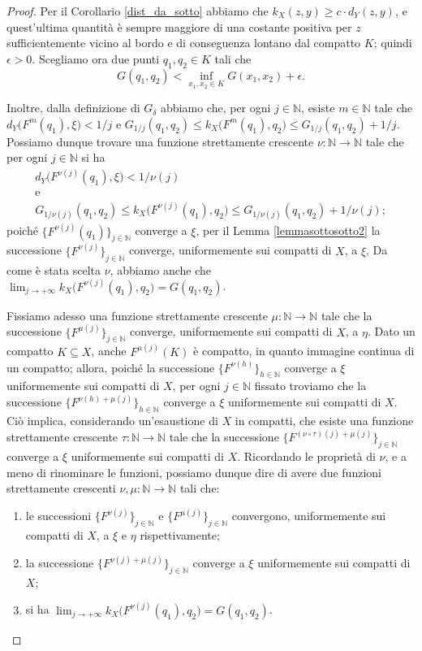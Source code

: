 \begin{proof}
    Per il Corollario \ref{dist_da_sotto} abbiamo che $k_X(z,y) \ge c\cdot d_Y(z,y)$, e quest'ultima quantità è sempre maggiore di una costante positiva per $z$ sufficientemente vicino al bordo e di conseguenza lontano dal compatto $K$; quindi $\epsilon>0$. Scegliamo ora due punti $q_1,q_2 \in K$ tali che
    $$G(q_1,q_2)<\inf_{x_1,x_2\in K}G(x_1,x_2)+\epsilon.$$
    
    Inoltre, dalla definizione di $G_{\delta}$ abbiamo che, per ogni $j\in\mathbb{N}$, esiste $m\in\mathbb{N}$ tale che $d_Y\big(F^m(q_1),\xi\big)<1/j$ e $G_{1/j}(q_1,q_2) \le k_X\big(F^m(q_1),q_2\big) \le G_{1/j}(q_1,q_2)+1/j$. Possiamo dunque trovare una funzione strettamente crescente $\nu:\mathbb{N}\longrightarrow\mathbb{N}$ tale che per ogni $j\in\mathbb{N}$ si ha
    \begin{gather*}
        d_Y\big(F^{\nu(j)}(q_1),\xi\big)<1/\nu(j)\\
        \text{e}\\
        G_{1/\nu(j)}(q_1,q_2) \le k_X\big(F^{\nu(j)}(q_1),q_2\big) \le G_{1/\nu(j)}(q_1,q_2)+1/\nu(j);
    \end{gather*}
    poiché $\{F^{\nu(j)}(q_1)\}_{j\in\mathbb{N}}$ converge a $\xi$, per il Lemma \ref{lemmasottosotto2} la successione $\{F^{\nu(j)}\}_{j\in\mathbb{N}}$ converge, uniformemente sui compatti di $X$, a $\xi$. Da come è stata scelta $\nu$, abbiamo anche che $\displaystyle\lim_{j\longrightarrow+\infty}k_X\big(F^{\nu(j)}(q_1),q_2\big)=G(q_1,q_2)$.

    Fissiamo adesso una funzione strettamente crescente $\mu:\mathbb{N}\longrightarrow\mathbb{N}$ tale che la successione $\{F^{\mu(j)}\}_{j\in\mathbb{N}}$ converge, uniformemente sui compatti di $X$, a $\eta$. Dato un compatto $K\subseteq X$, anche $F^{\mu(j)}(K)$ è compatto, in quanto immagine continua di un compatto; allora, poiché la successione $\{F^{\nu(h)}\}_{h\in\mathbb{N}}$ converge a $\xi$ uniformemente sui compatti di $X$, per ogni $j\in\mathbb{N}$ fissato troviamo che la successione $\{F^{\nu(h)+\mu(j)}\}_{h\in\mathbb{N}}$ converge a $\xi$ uniformemente sui compatti di $X$. Ciò implica, considerando un'esaustione di $X$ in compatti, che esiste una funzione strettamente crescente $\tau:\mathbb{N}\longrightarrow\mathbb{N}$ tale che la successione $\{F^{(\nu\circ\tau)(j)+\mu(j)}\}_{j\in\mathbb{N}}$ converge a $\xi$ uniformemente sui compatti di $X$. Ricordando le proprietà di $\nu$, e a meno di rinominare le funzioni, possiamo dunque dire di avere due funzioni strettamente crescenti $\nu,\mu:\mathbb{N}\longrightarrow\mathbb{N}$ tali che:
    \begin{enumerate}[label={(\arabic*)}]
        \item le successioni $\{F^{\nu(j)}\}_{j\in\mathbb{N}}$ e $\{F^{\mu(j)}\}_{j\in\mathbb{N}}$ convergono, uniformemente sui compatti di $X$, a $\xi$ e $\eta$ rispettivamente;
        \item la successione $\{F^{\nu(j)+\mu(j)}\}_{j\in\mathbb{N}}$ converge a $\xi$ uniformemente sui compatti di $X$;
        \item si ha $\displaystyle\lim_{j\longrightarrow+\infty}k_X\big(F^{\nu(j)}(q_1),q_2\big)=G(q_1,q_2)$.
    \end{enumerate}


\end{proof}
